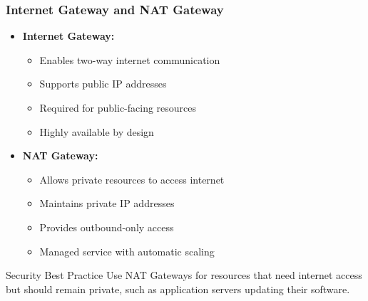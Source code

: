 \documentclass{beamer}
\begin{document}
\begin{frame}
    \frametitle{Internet Gateway and NAT Gateway}
    
    \begin{itemize}
        \item \textbf{Internet Gateway:}
        \begin{itemize}
            \item Enables two-way internet communication
            \item Supports public IP addresses
            \item Required for public-facing resources
            \item Highly available by design
        \end{itemize}
        
        \item \textbf{NAT Gateway:}
        \begin{itemize}
            \item Allows private resources to access internet
            \item Maintains private IP addresses
            \item Provides outbound-only access
            \item Managed service with automatic scaling
        \end{itemize}
    \end{itemize}
    
    \begin{alertblock}{Security Best Practice}
        Use NAT Gateways for resources that need internet access but should remain private, such as application servers updating their software.
    \end{alertblock}
\end{frame}
\end{document}
